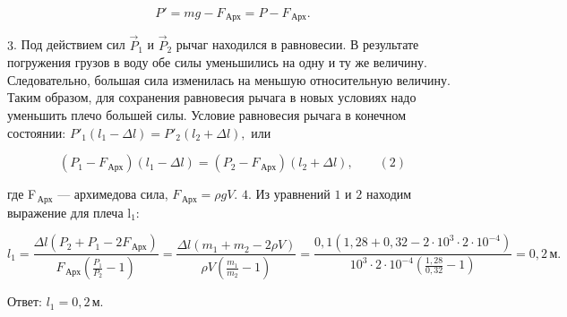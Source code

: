 \documentclass[12pt,a4paper]{article}
\begin{document}
{\[P' = mg - F_{\,\text{Арх}} = P - F_{\,\text{Арх}}.\]

$3$.  Под действием сил $\overrightarrow{P}_1$ и $\overrightarrow{P}_2$ рычаг находился в равновесии. В результате погружения грузов в воду обе силы уменьшились на одну и ту же величину. Следовательно, большая сила изменилась на меньшую относительную величину. Таким образом, для сохранения равновесия рычага в новых условиях надо уменьшить плечо большей силы.
Условие равновесия рычага в конечном состоянии: $P'_1 ( l_1 - \Delta l ) = P'_2 ( l_2 + \Delta l ) ,$ или

\[( P_1 - F_{\,\text{Арх}} ) ( l_1 - \Delta l ) = ( P_2 - F_{\,\text{Арх}} ) ( l_2 + \Delta l ) , \qquad ( 2 )\]

где F$_{\,\text{Арх}}$  — архимедова сила, $F_{\,\text{Арх}} = \rho gV.$
$4$.  Из уравнений $1$ и $2$ находим выражение для плеча l$_{1}$:

\[l_1 = \frac{\Delta l ( P_2 + P_1 - 2F_{\,\text{Арх}} )}{F_{\,\text{Арх}} ( \frac{P_1}{P_2} - 1 )} = \frac{\Delta l ( m_1 + m_2 - 2 \rho V )}{\rho V ( \frac{m_1}{m_2} - 1 )} = \frac{0{,}1 ( 1{,}28 + 0{,}32 - 2 \cdot 10 ^3 \cdot 2 \cdot 10 ^{ - 4 } )}{10 ^3 \cdot 2 \cdot 10 ^{-4} ( \frac{1{,}28}{0{,}32} - 1 )} = 0{,}2 \,\text{м}.\]

Ответ: $l_1 = 0{,}2 \,\text{м}.$
}
\end{document}
